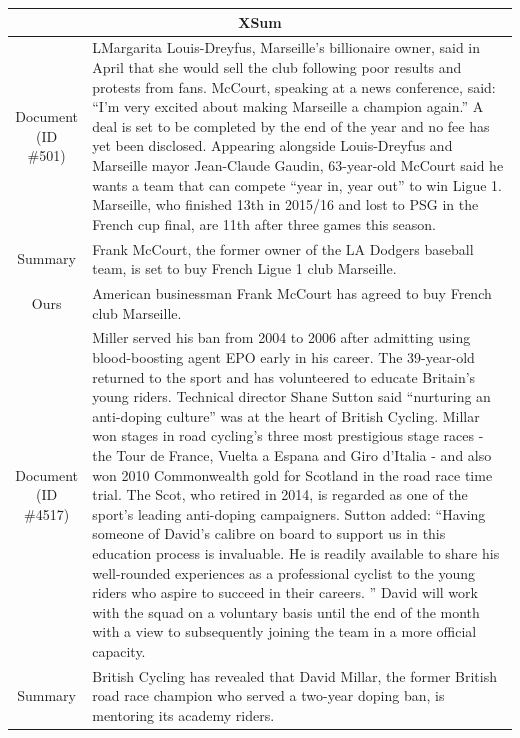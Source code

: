 \begin{table}[bth!]
\scriptsize
  \centering
  \renewcommand{\arraystretch}{1.3}
  \begin{tabular}{c|p{}}
  \hline
  
  \multicolumn{2}{c}{XSum} \\ \hline
  \makecell{Document\\(ID \#501)} & LMargarita Louis-Dreyfus, Marseille's billionaire owner, said in April that she would sell the club following poor results and protests from fans. McCourt, speaking at a news conference, said: ``I'm very excited about making Marseille a champion again.'' A deal is set to be completed by the end of the year and no fee has yet been disclosed. Appearing alongside Louis-Dreyfus and Marseille mayor Jean-Claude Gaudin, 63-year-old McCourt said he wants a team that can compete ``year in, year out'' to win Ligue 1. Marseille, who finished 13th in 2015/16 and lost to PSG in the French cup final, are 11th after three games this season. \\ \hline
  Summary & Frank McCourt, the former owner of the LA Dodgers baseball team, is set to buy French Ligue 1 club Marseille.  \\ \hline
  Ours & American businessman Frank McCourt has agreed to buy French club Marseille. \\ \hline
  \makecell{Document\\(ID \#4517)} & Miller served his ban from 2004 to 2006 after admitting using blood-boosting agent EPO early in his career. The 39-year-old returned to the sport and has volunteered to educate Britain's young riders. Technical director Shane Sutton said ``nurturing an anti-doping culture'' was at the heart of British Cycling. Millar won stages in road cycling's three most prestigious stage races - the Tour de France, Vuelta a Espana and Giro d'Italia - and also won 2010 Commonwealth gold for Scotland in the road race time trial. The Scot, who retired in 2014, is regarded as one of the sport's leading anti-doping campaigners. Sutton added: ``Having someone of David's calibre on board to support us in this education process is invaluable. He is readily available to share his well-rounded experiences as a professional cyclist to the young riders who aspire to succeed in their careers. '' David will work with the squad on a voluntary basis until the end of the month with a view to subsequently joining the team in a more official capacity. \\\hline 
  Summary & British Cycling has revealed that David Millar, the former British road race champion who served a two-year doping ban, is mentoring its academy riders. \\\hline 

\end{tabular}
\end{table}
